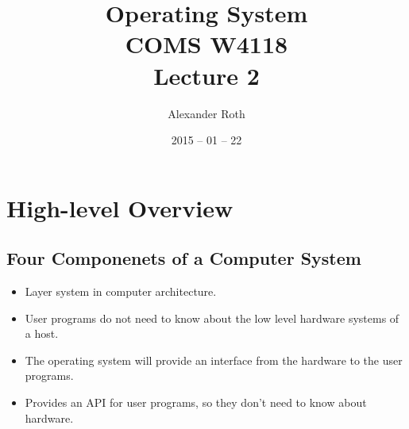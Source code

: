\documentclass[]{article}
\begin{document}
\newtheorem{thm}{Theorem}
\title{Operating System \\ COMS W4118 \\ Lecture 2}
\author{Alexander Roth}
\date{2015 -- 01 -- 22}
\maketitle

\section{High-level Overview}
\subsection{Four Componenets of a Computer System}
\begin{itemize}
\item Layer system in computer architecture.
\item User programs do not need to know about the low level hardware systems of
a host.
\item The operating system will provide an interface from the hardware to the
user programs.
\item Provides an API for user programs, so they don't need to know about
hardware.
\end{itemize}
\end{document}
